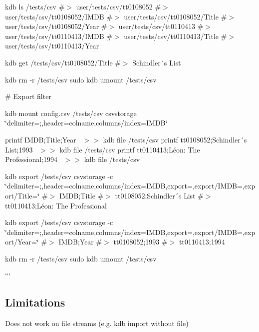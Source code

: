 kdb ls /tests/csv \#$>$ user/tests/csv/tt0108052 \#$>$ user/tests/csv/tt0108052/\+I\+M\+DB \#$>$ user/tests/csv/tt0108052/\+Title \#$>$ user/tests/csv/tt0108052/\+Year \#$>$ user/tests/csv/tt0110413 \#$>$ user/tests/csv/tt0110413/\+I\+M\+DB \#$>$ user/tests/csv/tt0110413/\+Title \#$>$ user/tests/csv/tt0110413/\+Year

kdb get /tests/csv/tt0108052/\+Title \#$>$ Schindler´s List

kdb rm -\/r /tests/csv sudo kdb umount /tests/csv


\begin{DoxyCode}
# Export filter
\end{DoxyCode}
 kdb mount config.\+csv /tests/csv csvstorage \char`\"{}delimiter=;,header=colname,columns/index=\+I\+M\+D\+B\char`\"{}

printf \textquotesingle{}I\+M\+DB;Title;Year~\newline
\textquotesingle{} $>$$>$ {\ttfamily kdb file /tests/csv} printf \textquotesingle{}tt0108052;Schindler´s List;1993~\newline
\textquotesingle{} $>$$>$ {\ttfamily kdb file /tests/csv} printf \textquotesingle{}tt0110413;Léon\+: The Professional;1994~\newline
\textquotesingle{} $>$$>$ {\ttfamily kdb file /tests/csv}

kdb export /tests/csv csvstorage -\/c \char`\"{}delimiter=;,header=colname,columns/index=\+I\+M\+D\+B,export=,export/\+I\+M\+D\+B=,export/\+Title=\char`\"{} \#$>$ I\+M\+DB;Title \#$>$ tt0108052;Schindler´s List \#$>$ tt0110413;Léon\+: The Professional

kdb export /tests/csv csvstorage -\/c \char`\"{}delimiter=;,header=colname,columns/index=\+I\+M\+D\+B,export=,export/\+I\+M\+D\+B=,export/\+Year=\char`\"{} \#$>$ I\+M\+DB;Year \#$>$ tt0108052;1993 \#$>$ tt0110413;1994

kdb rm -\/r /tests/csv sudo kdb umount /tests/csv

```

\subsection*{Limitations}


\begin{DoxyItemize}
\item Does not work on file streams (e.\+g. {\ttfamily kdb import} without file) 
\end{DoxyItemize}